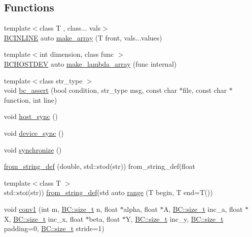 \subsection*{Functions}
\begin{DoxyCompactItemize}
\item 
{\footnotesize template$<$class T , class... vals$>$ }\\\hyperlink{BlackCat__Common_8h_a6699e8b0449da5c0fafb878e59c1d4b1}{B\+C\+I\+N\+L\+I\+NE} auto \hyperlink{namespaceBC_adb3312598e1b299e1dc72abc5d628e03}{make\+\_\+array} (T front, vals...\+values)
\item 
{\footnotesize template$<$int dimension, class func $>$ }\\\hyperlink{BlackCat__Common_8h_adf0d8d6bff3d32b4fa9fa91abebf4002}{B\+C\+H\+O\+S\+T\+D\+EV} auto \hyperlink{namespaceBC_a02f9533e8aa1aae5b946f6d969602039}{make\+\_\+lambda\+\_\+array} (func internal)
\item 
{\footnotesize template$<$class str\+\_\+type $>$ }\\void \hyperlink{namespaceBC_ae3e6d09c6f741d9a5c528ec74a76f1cb}{bc\+\_\+assert} (bool condition, str\+\_\+type msg, const char $\ast$file, const char $\ast$function, int line)
\item 
void \hyperlink{namespaceBC_a307ff8eb16e8fbe7a7492b8f4932acb0}{host\+\_\+sync} ()
\item 
void \hyperlink{namespaceBC_ae715d475db5272e26d72d016af287291}{device\+\_\+sync} ()
\item 
void \hyperlink{namespaceBC_a470040eaa8faabaf80974d0189c564f9}{synchronize} ()
\item 
\hyperlink{namespaceBC_a34dbc60dbc0f055dbc06971b6bc4fad8}{from\+\_\+string\+\_\+def} (double, std\+::stod(str)) from\+\_\+string\+\_\+def(float
\item 
{\footnotesize template$<$class T $>$ }\\std\+::stoi(str)) \hyperlink{namespaceBC_a34dbc60dbc0f055dbc06971b6bc4fad8}{from\+\_\+string\+\_\+def}(std auto \hyperlink{namespaceBC_a0fc024c5ff6c04c0c0f356356a065eb8}{range} (T begin, T end=T())
\item 
void \hyperlink{namespaceBC_a8f3806b0eabfafa9edce8d0ab8f08014}{conv1} (int m, \hyperlink{namespaceBC_a6007cbc4eeec401a037b558910a56173}{B\+C\+::size\+\_\+t} n, float $\ast$alpha, float $\ast$A, \hyperlink{namespaceBC_a6007cbc4eeec401a037b558910a56173}{B\+C\+::size\+\_\+t} inc\+\_\+a, float $\ast$X, \hyperlink{namespaceBC_a6007cbc4eeec401a037b558910a56173}{B\+C\+::size\+\_\+t} inc\+\_\+x, float $\ast$beta, float $\ast$Y, \hyperlink{namespaceBC_a6007cbc4eeec401a037b558910a56173}{B\+C\+::size\+\_\+t} inc\+\_\+y, \hyperlink{namespaceBC_a6007cbc4eeec401a037b558910a56173}{B\+C\+::size\+\_\+t} padding=0, \hyperlink{namespaceBC_a6007cbc4eeec401a037b558910a56173}{B\+C\+::size\+\_\+t} stride=1)

\end{DoxyCompactItemize}
